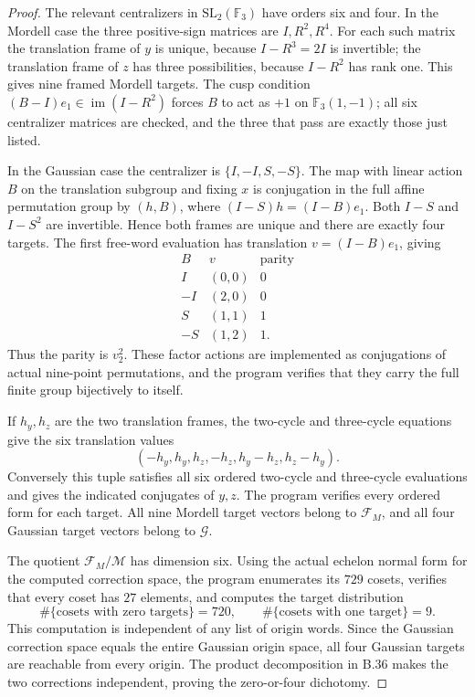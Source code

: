 \begin{proof}
The relevant centralizers in $\mathrm{SL}_2(\mathbb F_3)$ have
orders six and four. In the Mordell case the three positive-sign
matrices are $I,R^2,R^4$. For each such matrix the translation
frame of $y$ is unique, because $I-R^3=2I$ is invertible; the
translation frame of $z$ has three possibilities, because
$I-R^2$ has rank one. This gives nine framed Mordell targets.
The cusp condition $(B-I)e_1\in\operatorname{im}(I-R^2)$ forces
$B$ to act as $+1$ on $\mathbb F_3(1,-1)$; all six centralizer
matrices are checked, and the three that pass are exactly those
just listed.

In the Gaussian case the centralizer is $\{I,-I,S,-S\}$.
The map with linear action $B$ on the translation subgroup and
fixing $x$ is conjugation in the full affine permutation group by
$(h,B)$, where
$(I-S)h=(I-B)e_1$. Both $I-S$ and $I-S^2$ are invertible.
Hence both frames are unique and there are exactly four targets.
The first free-word evaluation has translation
$v=(I-B)e_1$, giving
\[
 \begin{array}{c|c|c}
 B&v&\text{parity}\\\hline
 I&(0,0)&0\\-I&(2,0)&0\\S&(1,1)&1\\-S&(1,2)&1.
 \end{array}
\]
Thus the parity is $v_2^2$. These factor actions are implemented
as conjugations of actual nine-point permutations, and the program
verifies that they carry the full finite group bijectively to itself.

If $h_y,h_z$ are the two translation frames, the two-cycle and
three-cycle equations give the six translation values
\[
 (-h_y,h_y,h_z,-h_z,h_y-h_z,h_z-h_y).                            \tag{ER3}
\]
Conversely this tuple satisfies all six ordered two-cycle and
three-cycle evaluations and gives the indicated conjugates of
$y,z$. The program verifies every ordered form for each target.
All nine Mordell target vectors belong to $\mathcal F_M$, and all
four Gaussian target vectors belong to $\mathcal G$.

The quotient $\mathcal F_M/\mathcal M$ has dimension six.
Using the actual echelon normal form for the computed correction
space, the program enumerates its $729$ cosets, verifies that every
coset has $27$ elements, and computes the target distribution
\[
       \#\{\text{cosets with zero targets}\}=720,\qquad
       \#\{\text{cosets with one target}\}=9.
\]
This computation is independent of any list of origin words.
Since the Gaussian correction space equals the entire Gaussian
origin space, all four Gaussian targets are reachable from every
origin. The product decomposition in B.36 makes the two
corrections independent, proving the zero-or-four dichotomy.


\end{proof}
